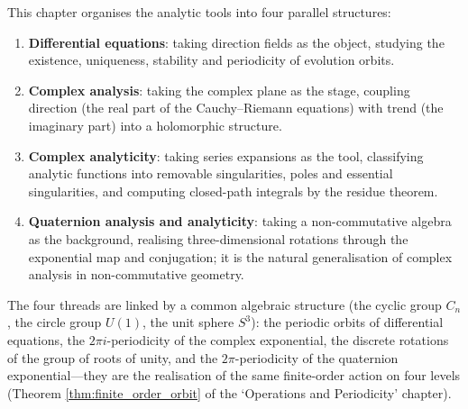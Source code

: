 \begin{remark}\label{rem:diffeq_complex_unity}
This chapter organises the analytic tools into four parallel structures:
\begin{enumerate}[label=(\roman*)]
    \item \textbf{Differential equations}: taking direction fields as the object, studying the existence, uniqueness, stability and periodicity of evolution orbits.
    \item \textbf{Complex analysis}: taking the complex plane as the stage, coupling direction (the real part of the Cauchy--Riemann equations) with trend (the imaginary part) into a holomorphic structure.
    \item \textbf{Complex analyticity}: taking series expansions as the tool, classifying analytic functions into removable singularities, poles and essential singularities, and computing closed-path integrals by the residue theorem.
    \item \textbf{Quaternion analysis and analyticity}: taking a non-commutative algebra as the background, realising three-dimensional rotations through the exponential map and conjugation; it is the natural generalisation of complex analysis in non-commutative geometry.
\end{enumerate}
The four threads are linked by a common algebraic structure (the cyclic group $C_n$, the circle group $U(1)$, the unit sphere $S^3$): the periodic orbits of differential equations, the $2\pi i$-periodicity of the complex exponential, the discrete rotations of the group of roots of unity, and the $2\pi$-periodicity of the quaternion exponential---they are the realisation of the same finite-order action on four levels (Theorem \ref{thm:finite_order_orbit} of the `Operations and Periodicity' chapter).
\end{remark}

